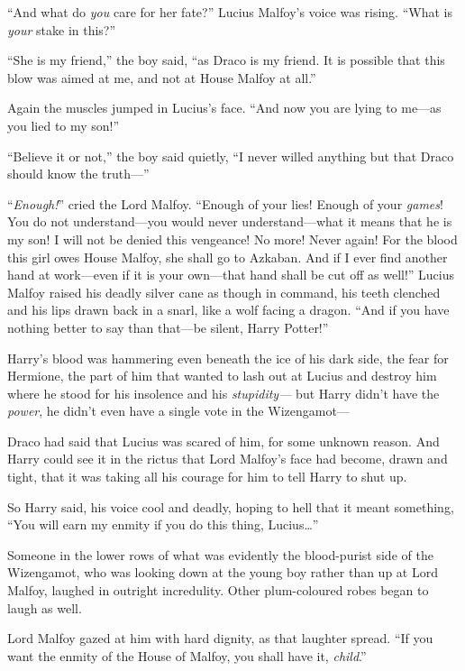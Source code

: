 “And what do \emph{you} care for her fate?” Lucius Malfoy’s voice was rising. “What is \emph{your} stake in this?”

“She is my friend,” the boy said, “as Draco is my friend. It is possible that this blow was aimed at me, and not at House Malfoy at all.”

Again the muscles jumped in Lucius’s face. “And now you are lying to me—as you lied to my son!”

“Believe it or not,” the boy said quietly, “I never willed anything but that Draco should know the truth—”

“\emph{Enough!}” cried the Lord Malfoy. “Enough of your lies! Enough of your \emph{games}! You do not understand—you would never understand—what it means that he is my son! I will not be denied this vengeance! No more! Never again! For the blood this girl owes House Malfoy, she shall go to Azkaban. And if I ever find another hand at work—even if it is your own—that hand shall be cut off as well!” Lucius Malfoy raised his deadly silver cane as though in command, his teeth clenched and his lips drawn back in a snarl, like a wolf facing a dragon. “And if you have nothing better to say than that—be silent, Harry Potter!”

\later

Harry’s blood was hammering even beneath the ice of his dark side, the fear for Hermione, the part of him that wanted to lash out at Lucius and destroy him where he stood for his insolence and his \emph{stupidity—} but Harry didn’t have the \emph{power}, he didn’t even have a single vote in the Wizengamot—

Draco had said that Lucius was scared of him, for some unknown reason. And Harry could see it in the rictus that Lord Malfoy’s face had become, drawn and tight, that it was taking all his courage for him to tell Harry to shut up.

So Harry said, his voice cool and deadly, hoping to hell that it meant something, “You will earn my enmity if you do this thing, Lucius…”

Someone in the lower rows of what was evidently the blood-purist side of the Wizengamot, who was looking down at the young boy rather than up at Lord Malfoy, laughed in outright incredulity. Other plum-coloured robes began to laugh as well.

Lord Malfoy gazed at him with hard dignity, as that laughter spread. “If you want the enmity of the House of Malfoy, you shall have it, \emph{child}.”

